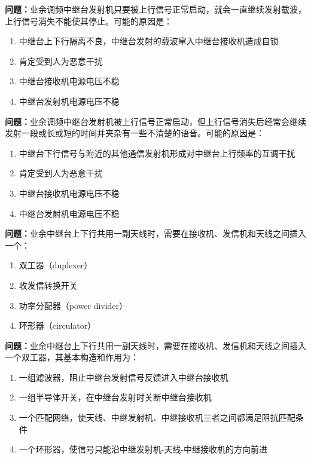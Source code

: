 \bigskip


\noindent\textbf{问题：}业余调频中继台发射机只要被上行信号正常启动，就会一直继续发射载波，上行信号消失不能使其停止。可能的原因是：
\begin{enumerate}[label=\Alph*), leftmargin=3em]
\item 中继台上下行隔离不良，中继台发射的载波窜入中继台接收机造成自锁
\item 肯定受到人为恶意干扰
\item 中继台接收机电源电压不稳
\item 中继台发射机电源电压不稳
\end{enumerate}

\bigskip


\noindent\textbf{问题：}业余调频中继台发射机被上行信号正常启动，但上行信号消失后经常会继续发射一段或长或短的时间并夹杂有一些不清楚的语音。可能的原因是：
\begin{enumerate}[label=\Alph*), leftmargin=3em]
\item 中继台下行信号与附近的其他通信发射机形成对中继台上行频率的互调干扰
\item 肯定受到人为恶意干扰
\item 中继台接收机电源电压不稳
\item 中继台发射机电源电压不稳
\end{enumerate}

\bigskip


\noindent\textbf{问题：}业余中继台上下行共用一副天线时，需要在接收机、发信机和天线之间插入一个：
\begin{enumerate}[label=\Alph*), leftmargin=3em]
\item 双工器（duplexer）
\item 收发信转换开关
\item 功率分配器（power divider）
\item 环形器（circulator）
\end{enumerate}

\bigskip


\noindent\textbf{问题：}业余中继台上下行共用一副天线时，需要在接收机、发信机和天线之间插入一个双工器，其基本构造和作用为：
\begin{enumerate}[label=\Alph*), leftmargin=3em]
\item 一组滤波器，阻止中继台发射信号反馈进入中继台接收机
\item 一组半导体开关，在中继台发射时关断中继台接收机
\item 一个匹配网络，使天线、中继发射机、中继接收机三者之间都满足阻抗匹配条件
\item 一个环形器，使信号只能沿中继发射机-天线-中继接收机的方向前进
\end{enumerate}

